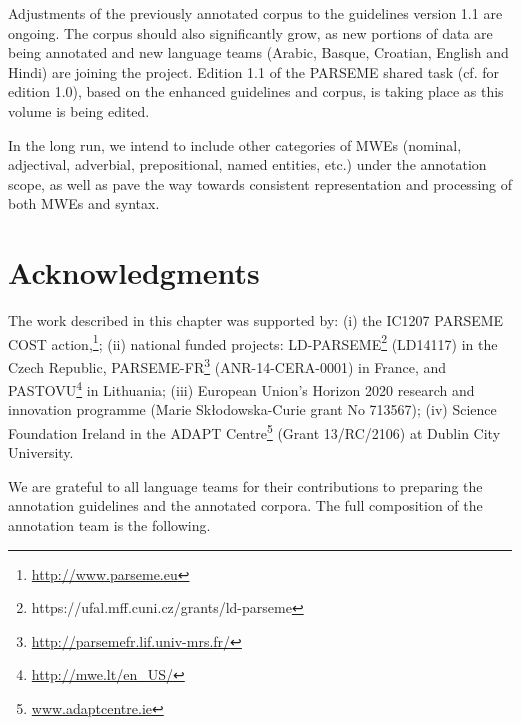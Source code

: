 \documentclass[output=paper,modfonts]{langscibook}
\begin{document}
Adjustments of the previously annotated corpus to the guidelines version 1.1 are ongoing. 
The corpus should also significantly grow, as new portions of data are being annotated and new language teams (Arabic, Basque, Croatian, English and Hindi) 
are joining the project. Edition 1.1 of the PARSEME shared task (cf. \citealt{MWEWorkshop} for edition 1.0), based on the enhanced guidelines and corpus, is taking place as this volume is being edited. 

In the long run, we intend to include other categories of MWEs (nominal, adjectival, adverbial, prepositional, named entities, etc.) under the annotation scope, as well as pave the way towards consistent representation and processing of both MWEs and syntax. 

\section*{Acknowledgments}
%

The work described in this chapter was supported by: (i) the IC1207 PARSEME COST action,\footnote{\url{http://www.parseme.eu}}; 
(ii) national funded projects: LD-PARSEME\footnote{https://ufal.mff.cuni.cz/grants/ld-parseme} (LD14117) in the Czech Republic, PARSEME-FR\footnote{\url{http://parsemefr.lif.univ-mrs.fr/}} (ANR-14-CERA-0001) in France, and PAS\-TO\-VU\footnote{\url{http://mwe.lt/en_US/}} in Lithuania;
(iii) European Union’s Horizon 2020 research and innovation programme (Marie Skłodowska-Curie grant No 713567); (iv) Science Foundation Ireland in the ADAPT Centre\footnote{\url{www.adaptcentre.ie}} (Grant 13/RC/2106) at Dublin City University.

We are grateful to all language teams for their contributions to preparing the annotation guidelines and the annotated corpora. The full composition of the annotation team is the following.\vspace{0.3cm}
\end{document}
